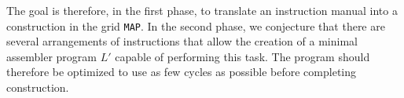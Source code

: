 \noindent 
The goal is therefore, in the first phase, to translate an instruction 
manual into a construction in the grid \texttt{MAP}. In the second 
phase, we conjecture that there are several arrangements of 
instructions that allow the creation of a minimal assembler program 
$L'$ capable of performing this task. The program should therefore be 
optimized to use as few cycles as possible before completing 
construction.
